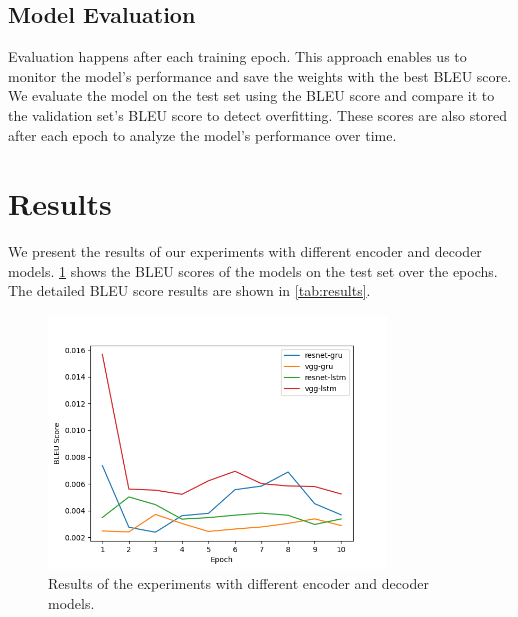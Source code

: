 \documentclass[12pt]{article}
\theoremstyle{plain}
\theoremstyle{definition}
\theoremstyle{remark}
\begin{document}
\subsection{Model Evaluation}
Evaluation happens after each training epoch. This approach enables us to monitor the model's performance and save the weights with the best BLEU score. We evaluate the model on the test set using the BLEU score and compare it to the validation set's BLEU score to detect overfitting. These scores are also stored after each epoch to analyze the model's performance over time.



\section{Results}
\label{sec:results}

We present the results of our experiments with different encoder and decoder models. \ref{fig:results} shows the BLEU scores of the models on the test set over the epochs. The detailed BLEU score results are shown in \ref{tab:results}.

\begin{figure}[H]
    \centering
    \includegraphics[width=0.8\textwidth]{res/results.png}
    \caption{Results of the experiments with different encoder and decoder models.}
    \label{fig:results}
\end{figure}
\end{document}
